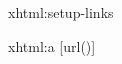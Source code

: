 %
%
%

\startxmlsetups xhtml:setup-links
\stopxmlsetups


\startxmlsetups xhtml:a
	[url()]
\stopxmlsetups

